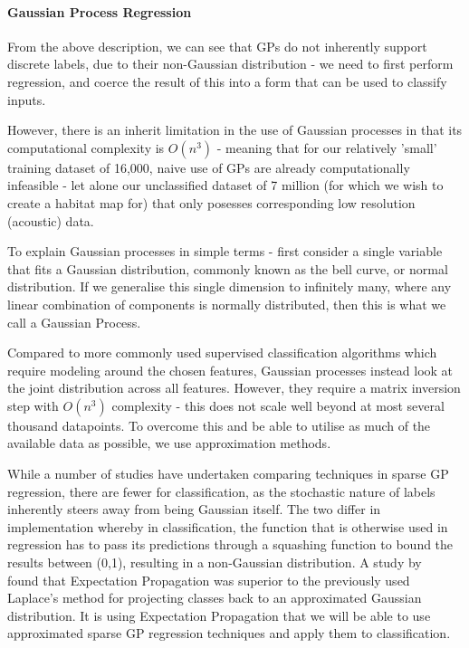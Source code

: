 \documentclass[10pt]{article}
\begin{document}
\begin{multicols}{2}
    \paragraph{Gaussian Process Regression}

    From the above description, we can see that GPs do not inherently support discrete labels, due to their non-Gaussian distribution - we need to first perform regression, and coerce the result of this into a form that can be used to classify inputs. 

However, there is an inherit limitation in the use of Gaussian processes in that its computational complexity is $O(n^3)$ - meaning that for our relatively 'small' training dataset of 16,000, naive use of GPs are already computationally infeasible - let alone our unclassified dataset of 7 million (for which we wish to create a habitat map for) that only posesses corresponding low resolution (acoustic) data.

To explain Gaussian processes in simple terms - first consider a single variable that fits a Gaussian distribution, commonly known as the bell curve, or normal distribution. If we generalise this single dimension to infinitely many, where any linear combination of components is normally distributed, then this is what we call a Gaussian Process.

Compared to more commonly used supervised classification algorithms which require modeling around the chosen features, Gaussian processes instead look at the joint distribution across all features. However, they require a matrix inversion step with $O(n^3)$ complexity - this does not scale well beyond at most several thousand datapoints. To overcome this and be able to utilise as much of the available data as possible, we use approximation methods.

While a number of studies have undertaken comparing techniques in sparse GP regression, there are fewer for classification, as the stochastic nature of labels inherently steers away from being Gaussian itself. The two differ in implementation whereby in classification, the function that is otherwise used in regression has to pass its predictions through a squashing function to bound the results between (0,1), resulting in a non-Gaussian distribution. A study by ~\citet{kuss05} found that Expectation Propagation was superior to the previously used Laplace's method for projecting classes back to an approximated Gaussian distribution. It is using Expectation Propagation that we will be able to use approximated sparse GP regression techniques and apply them to classification.


\end{multicols}
\end{document}
